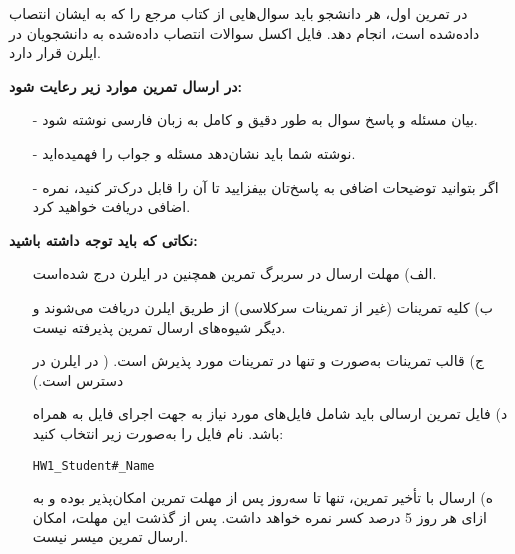 در تمرین اول، هر دانشجو باید سوال‌هایی از کتاب مرجع را که به ایشان انتصاب داده‌شده است، انجام دهد. فایل اکسل سوالات انتصاب داده‌شده به دانشجویان در ایلرن قرار دارد.

\textbf{در ارسال تمرین موارد زیر رعایت شود:}

\begin{itemize}
	\item[-]
	 بیان مسئله و پاسخ سوال به طور دقیق و کامل به زبان فارسی نوشته شود.

	\item[-]	
	 نوشته شما باید نشان‌دهد مسئله و جواب را فهمیده‌اید.
	
	\item[-]	
	اگر بتوانید توضیحات اضافی به پاسخ‌تان بیفزایید تا آن را قابل‌ درک‌تر کنید، نمره اضافی دریافت خواهید کرد.
\end{itemize}

\textbf{نکاتی که باید توجه داشته باشید:}

\begin{itemize}
	\item[الف)]
	مهلت ارسال در سربرگ تمرین همچنین در ایلرن درج شده‌است.
	\item[ب)]
	کلیه تمرینات (غیر از تمرینات سرکلاسی) از طریق ایلرن دریافت می‌شوند و دیگر شیوه‌های ارسال تمرین پذیرفته نیست.
	\item[ج)]
	قالب تمرینات به‌صورت \lr{\LaTeX} و تنها در  تمرینات مورد پذیرش است. ( در ایلرن در دسترس است.)
	\item[د)]	
	فایل تمرین ارسالی باید شامل فایل‌های مورد نیاز به جهت اجرای فایل \lr{\LaTeX} به همراه  باشد. نام فايل را به‌صورت زير انتخاب كنيد:

\begin{latin} \begin{center}
		\texttt{HW1\_Student\#\_Name}
	\end{center}
\end{latin}

	\item[ه)]
	ارسال با تأخیر تمرین، تنها تا سه‌روز پس از مهلت تمرین امکان‌پذیر بوده و به ازای هر روز 5 درصد کسر نمره خواهد داشت. پس از گذشت این مهلت، امکان ارسال تمرین میسر نیست.
\end{itemize}
